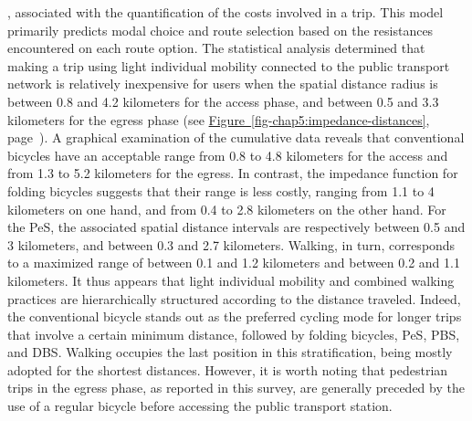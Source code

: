\begin{refsegment}
{}, associated with the quantification of the costs involved in a trip. This model primarily predicts modal choice and route selection based on the resistances encountered on each route option. The statistical analysis determined that making a trip using light individual mobility connected to the public transport network is relatively inexpensive for users when the spatial distance radius is between 0.8 and 4.2 kilometers for the access phase, and between 0.5 and 3.3 kilometers for the egress phase (see \hyperref[fig-chap5:impedance-distances]{Figure~\ref{fig-chap5:impedance-distances}}, page~\pageref{fig-chap5:impedance-distances}). A graphical examination of the cumulative data reveals that conventional bicycles have an acceptable range from 0.8 to 4.8 kilometers for the access and from 1.3 to 5.2 kilometers for the egress. In contrast, the impedance function for folding bicycles suggests that their range is less costly, ranging from 1.1 to 4 kilometers on one hand, and from 0.4 to 2.8 kilometers on the other hand. For the \acrfull{PeS}, the associated spatial distance intervals are respectively between 0.5 and 3 kilometers, and between 0.3 and 2.7 kilometers. Walking, in turn, corresponds to a maximized range of between 0.1 and 1.2 kilometers and between 0.2 and 1.1 kilometers. It thus appears that light individual mobility and combined walking practices are hierarchically structured according to the distance traveled. Indeed, the conventional bicycle stands out as the preferred cycling mode for longer trips that involve a certain minimum distance, followed by folding bicycles, \acrshort{PeS}, \acrfull{PBS}, and \acrfull{DBS}. Walking occupies the last position in this stratification, being mostly adopted for the shortest distances. However, it is worth noting that pedestrian trips in the egress phase, as reported in this survey, are generally preceded by the use of a regular bicycle before accessing the public transport station.%


\end{refsegment}
